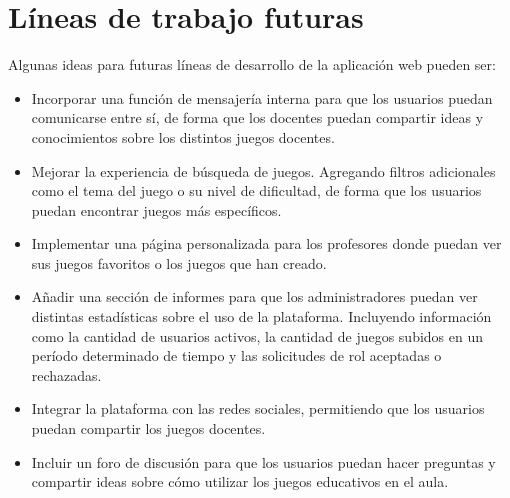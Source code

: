 \section{Líneas de trabajo futuras}
Algunas ideas para futuras líneas de desarrollo de la aplicación web pueden ser:

\begin{itemize}
    \item Incorporar una función de mensajería interna para que los usuarios puedan comunicarse entre sí, de forma que los docentes puedan compartir ideas y conocimientos sobre los distintos juegos docentes.
    \item Mejorar la experiencia de búsqueda de juegos. Agregando filtros adicionales como el tema del juego o su nivel de dificultad, de forma que los usuarios puedan encontrar juegos más específicos.
    \item Implementar una página personalizada para los profesores donde puedan ver sus juegos favoritos o los juegos que han creado.
    \item Añadir una sección de informes para que los administradores puedan ver distintas estadísticas sobre el uso de la plataforma. Incluyendo información como la cantidad de usuarios activos, la cantidad de juegos subidos en un período determinado de tiempo y las solicitudes de rol aceptadas o rechazadas.
    \item Integrar la plataforma con las redes sociales, permitiendo que los usuarios puedan compartir los juegos docentes.
    \item Incluir un foro de discusión para que los usuarios puedan hacer preguntas y compartir ideas sobre cómo utilizar los juegos educativos en el aula.
\end{itemize}